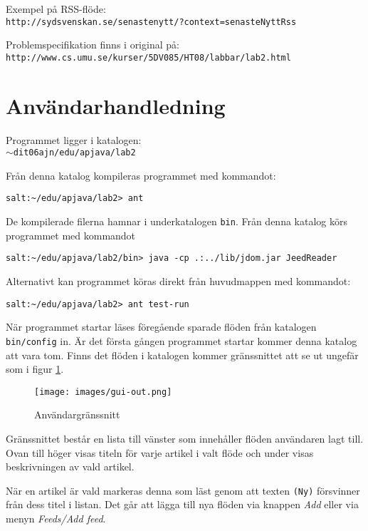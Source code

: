 \documentclass[a4paper, 12pt]{article}
\def\pathtocode{$\sim$dit06ajn/edu/apjava/lab2}
\begin{document}
Exempel på RSS-flöde:\\
\verb!http://sydsvenskan.se/senastenytt/?context=senasteNyttRss!

Problemspecifikation finns i original på:\\
\verb!http://www.cs.umu.se/kurser/5DV085/HT08/labbar/lab2.html!

\section{Användarhandledning}\label{Anvandarhandledning}
Programmet ligger i katalogen:\\
\texttt{\pathtocode}

Från denna katalog kompileras programmet med kommandot:

\verb!salt:~/edu/apjava/lab2> ant!

De kompilerade filerna hamnar i underkatalogen \verb!bin!. Från denna
katalog körs programmet med kommandot

\verb!salt:~/edu/apjava/lab2/bin> java -cp .:../lib/jdom.jar JeedReader!

Alternativt kan programmet köras direkt från huvudmappen med
kommandot:

\verb!salt:~/edu/apjava/lab2> ant test-run!

När programmet startar läses föregående sparade flöden från katalogen
\verb!bin/config! in. Är det första gången programmet startar kommer
denna katalog att vara tom. Finns det flöden i katalogen kommer
gränssnittet att se ut ungefär som i figur \ref{fig:gui-out}.

\begin{figure}[H]
  \begin{center}
    \texttt{[image: images/gui-out.png]}
    \caption{Användargränssnitt}
    \label{fig:gui-out}
  \end{center}
\end{figure}

Gränssnittet består en lista till vänster som innehåller flöden
användaren lagt till. Ovan till höger visas titeln för varje artikel i
valt flöde och under visas beskrivningen av vald artikel.

När en artikel är vald markeras denna som läst genom att texten
\verb!(Ny)! försvinner från dess titel i listan. Det går att lägga
till nya flöden via knappen \textit{Add} eller via menyn
\textit{Feeds/Add feed}.
\end{document}
